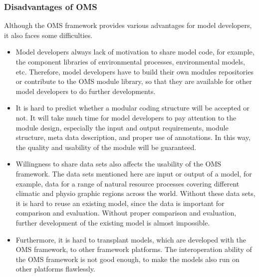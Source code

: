 \subsubsection{Disadvantages of OMS}
\par
Although the OMS framework provides various advantages for model developers, it also faces some difficulties. \autocite{dsl:oms-ahuja}
\begin{itemize}
\item Model developers always lack of motivation to share model code, for example, the component libraries of environmental processes, environmental models, etc. Therefore, model developers have to build their own modules repositories or contribute to the OMS module library, so that they are available for other model developers to do further developments.

\item It is hard to predict whether a modular coding structure will be accepted or not. It will take much time for model developers to pay attention to the module design, especially the input and output requirements, module structure, meta data description, and proper use of annotations. In this way, the quality and usability of the module will be guaranteed.

\item Willingness to share data sets also affects the usability of the OMS framework. The data sets mentioned here are input or output of a model, for example, data for a range of natural resource processes covering different climatic and physio graphic regions across the world. Without these data sets, it is hard to reuse an existing model, since the data is important for comparison and evaluation. Without proper comparison and evaluation, further development of the existing model is almost impossible.

\item Furthermore, it is hard to transplant models, which are developed with the OMS framework, to other framework platforms. The interoperation ability of the OMS framework is not good enough, to make the models also run on other platforms flawlessly.

\end{itemize}
